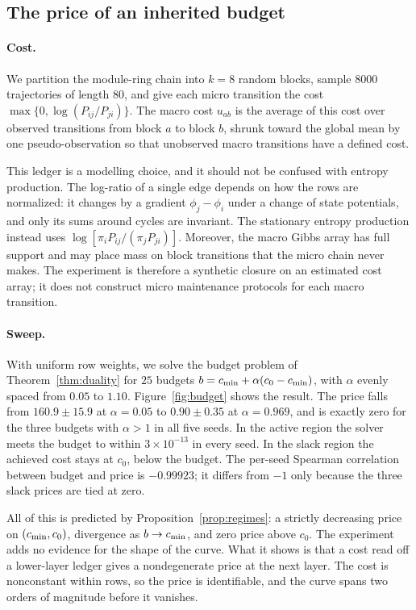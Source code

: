 \subsection{The price of an inherited budget}\label{sec:lab-price}

\paragraph{Cost.} We partition the module-ring chain into \(k=8\) random blocks, sample \(8000\) trajectories of length \(80\), and give each micro transition the cost \(\max\{0,\log(P_{ij}/P_{ji})\}\). The macro cost \(u_{ab}\) is the average of this cost over observed transitions from block \(a\) to block \(b\), shrunk toward the global mean by one pseudo-observation so that unobserved macro transitions have a defined cost.

This ledger is a modelling choice, and it should not be confused with entropy production. The log-ratio of a single edge depends on how the rows are normalized: it changes by a gradient \(\phi_j-\phi_i\) under a change of state potentials, and only its sums around cycles are invariant. The stationary entropy production instead uses \(\log[\pi_iP_{ij}/(\pi_jP_{ji})]\). Moreover, the macro Gibbs array has full support and may place mass on block transitions that the micro chain never makes. The experiment is therefore a synthetic closure on an estimated cost array; it does not construct micro maintenance protocols for each macro transition.

\paragraph{Sweep.} With uniform row weights, we solve the budget problem of Theorem~\ref{thm:duality} for \(25\) budgets \(b=c_{\min}+\alpha(c_0-c_{\min})\), with \(\alpha\) evenly spaced from \(0.05\) to \(1.10\). Figure~\ref{fig:budget} shows the result. The price falls from \(160.9\pm15.9\) at \(\alpha=0.05\) to \(0.90\pm0.35\) at \(\alpha=0.969\), and is exactly zero for the three budgets with \(\alpha>1\) in all five seeds. In the active region the solver meets the budget to within \(3\times10^{-13}\) in every seed. In the slack region the achieved cost stays at \(c_0\), below the budget. The per-seed Spearman correlation between budget and price is \(-0.99923\); it differs from \(-1\) only because the three slack prices are tied at zero.

All of this is predicted by Proposition~\ref{prop:regimes}: a strictly decreasing price on \((c_{\min},c_0)\), divergence as \(b\to c_{\min}\), and zero price above \(c_0\). The experiment adds no evidence for the shape of the curve. What it shows is that a cost read off a lower-layer ledger gives a nondegenerate price at the next layer. The cost is nonconstant within rows, so the price is identifiable, and the curve spans two orders of magnitude before it vanishes.

